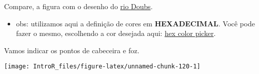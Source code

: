 \documentclass[
]{book}
\newenvironment{Shaded}{\begin{snugshade}}{\end{snugshade}}
\newcommand{\AttributeTok}[1]{\textcolor[rgb]{0.77,0.63,0.00}{#1}}
\newcommand{\DecValTok}[1]{\textcolor[rgb]{0.00,0.00,0.81}{#1}}
\newcommand{\FunctionTok}[1]{\textcolor[rgb]{0.00,0.00,0.00}{#1}}
\newcommand{\NormalTok}[1]{#1}
\newcommand{\OtherTok}[1]{\textcolor[rgb]{0.56,0.35,0.01}{#1}}
\newcommand{\SpecialCharTok}[1]{\textcolor[rgb]{0.00,0.00,0.00}{#1}}
\newcommand{\StringTok}[1]{\textcolor[rgb]{0.31,0.60,0.02}{#1}}
\providecommand{\tightlist}{%
  \setlength{\itemsep}{0pt}\setlength{\parskip}{0pt}}
\begin{document}
Compare, a figura com o desenho do \href{https://pt.wikipedia.org/wiki/Rio_Doubs}{rio Doubs}.

\begin{itemize}
\tightlist
\item
  obs: utilizamos aqui a definição de cores em \textbf{HEXADECIMAL}. Você pode fazer o mesmo, escolhendo a cor desejada aqui: \href{https://www.google.com/search?q=hex+color+picker\&oq=hex+color+picker\&aqs=chrome..69i57j0l7.11304j0j4\&sourceid=chrome\&ie=UTF-8}{hex color picker}.
\end{itemize}

Vamos indicar os pontos de cabeceira e foz.

\begin{Shaded}
\end{Shaded}

\begin{center}\texttt{[image: IntroR\_files/figure-latex/unnamed-chunk-120-1]} \end{center}
\end{document}
